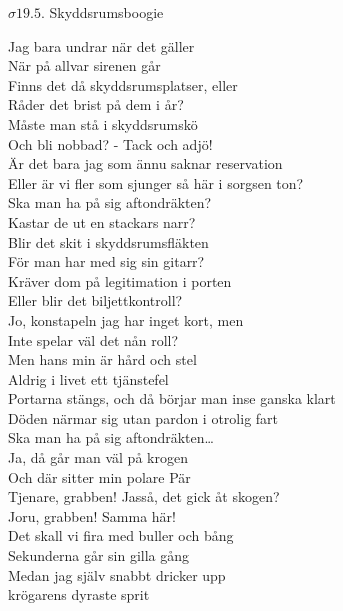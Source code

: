 \documentclass[a6paper,10pt]{article}
\begin{document}
\begin{center}
\Large $\sigma19.5$. Skyddsrumsboogie\\
\end{center}\small Jag bara undrar när det gäller\\
När på allvar sirenen går\\
Finns det då skyddsrumsplatser, eller\\
Råder det brist på dem i år?\\
Måste man stå i skyddsrumskö\\
Och bli nobbad? - Tack och adjö!\\
Är det bara jag som ännu saknar reservation\\
Eller är vi fler som sjunger så här i sorgsen ton?
\vspace{5pt}\\
Ska man ha på sig aftondräkten?\\
Kastar de ut en stackars narr?\\
Blir det skit i skyddsrumsfläkten\\
För man har med sig sin gitarr?
\vspace{5pt}\\
Kräver dom på legitimation i porten\\
Eller blir det biljettkontroll?\\
Jo, konstapeln jag har inget kort, men\\
Inte spelar väl det nån roll?\\
Men hans min är hård och stel\\
Aldrig i livet ett tjänstefel\\
Portarna stängs, och då börjar man inse ganska klart\\
Döden närmar sig utan pardon i otrolig fart
\vspace{5pt}\\
Ska man ha på sig aftondräkten… 
\vspace{5pt}\\
Ja, då går man väl på krogen\\
Och där sitter min polare Pär\\
Tjenare, grabben! Jasså, det gick åt skogen?\\
Joru, grabben! Samma här!\\
Det skall vi fira med buller och bång\\
Sekunderna går sin gilla gång\\
Medan jag själv snabbt dricker upp\\
krögarens dyraste sprit\\
\end{document}
